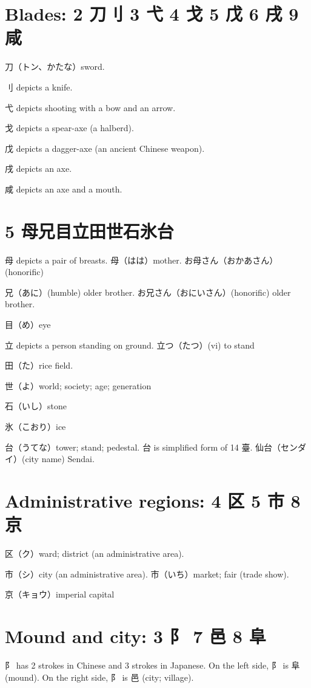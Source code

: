 \section{Blades: 2 刀刂 3 弋 4 戈 5 戊 6 戌 9 咸}

刀（トン、かたな）sword.

刂 depicts a knife.

弋 depicts shooting with a bow and an arrow.

戈 depicts a spear-axe (a halberd).

戊 depicts a dagger-axe (an ancient Chinese weapon).

戌 depicts an axe.

咸 depicts an axe and a mouth.

\section{5 母兄目立田世石氷台}

母 depicts a pair of breasts.
母（はは）mother.
お母さん（おかあさん）(honorific)

兄（あに）(humble) older brother.
お兄さん（おにいさん）(honorific) older brother.

目（め）eye

立 depicts a person standing on ground.
立つ（たつ）(vi) to stand

田（た）rice field.

世（よ）world; society; age; generation

石（いし）stone

氷（こおり）ice

台（うてな）tower; stand; pedestal.
台 is simplified form of 14 臺.
仙台（センダイ）(city name) Sendai.

\section{Administrative regions: 4 区 5 市 8 京}

区（ク）ward; district (an administrative area).

市（シ）city (an administrative area).
市（いち）market; fair (trade show).

京（キョウ）imperial capital

\section{Mound and city: 3 阝 7 邑 8 阜}

阝 has 2 strokes in Chinese and 3 strokes in Japanese.
On the left side, 阝 is 阜 (mound).
On the right side, 阝 is 邑 (city; village).

